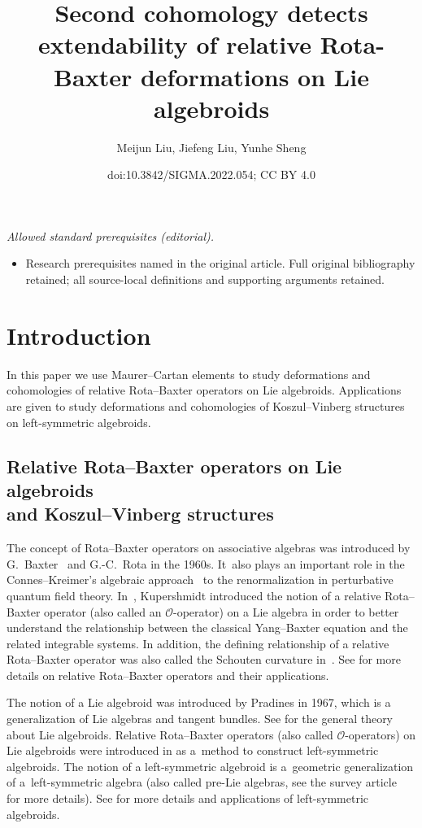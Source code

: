 \documentclass[10pt,a4paper]{amsart}
\title{Second cohomology detects extendability of relative Rota-Baxter deformations on Lie algebroids}
\author{Meijun Liu, Jiefeng Liu, Yunhe Sheng}
\date{doi:10.3842/SIGMA.2022.054; CC BY 4.0}
\numberwithin{equation}{section}
\newcommand{\huaO}{\mathcal{O}}
\begin{document}
\maketitle
\noindent\textit{Allowed standard prerequisites (editorial).}\begin{itemize}
\item Research prerequisites named in the original article. Full original bibliography retained; all source-local definitions and supporting arguments retained.
\end{itemize}\medskip
\section{Introduction}%

In this paper we use Maurer--Cartan elements to study deformations and cohomologies of relative Rota--Baxter operators on Lie algebroids. Applications are given to study deformations and cohomologies of Koszul--Vinberg structures on left-symmetric algebroids.

\subsection[Relative Rota--Baxter operators on Lie algebroids and Koszul--Vinberg structures]{Relative Rota--Baxter operators on Lie algebroids\\ and Koszul--Vinberg structures}

 The concept of Rota--Baxter operators on associative algebras was introduced by G.~Baxter~\cite{Ba} and G.-C.~Rota \cite{RotaI,RotaII} in the 1960s. It~also plays an important role in the Connes--Kreimer's algebraic approach~\cite{CK} to the renormalization in perturbative quantum field theory.
 In~\cite{Kuper1},
Kupershmidt introduced the notion of a relative Rota--Baxter operator (also called an $\huaO$-operator) on a Lie algebra in order to better understand the relationship between the classical Yang--Baxter equation and the related integrable systems. In addition, the defining relationship of a relative Rota--Baxter operator was also called the Schouten curvature in~\cite{Kos}. See \cite{Car,Fard,Gu0-1,Guo,Rota--Baxter_Lie_algebroid,PBG,Uchino2} for more details on relative Rota--Baxter operators and their applications.

 The notion of a Lie algebroid was introduced by Pradines in 1967, which
is a generalization of Lie algebras and tangent bundles.
See \cite{General-theory-of-Lie-groupoid-and-Lie-algebroid} for the general
theory about Lie algebroids. Relative Rota--Baxter operators (also called $\huaO$-operators) on Lie algebroids were introduced in \cite{LiuShengBaiChen} as a~method to construct left-symmetric algebroids. The notion of a left-symmetric algebroid is a~geometric generalization of a~left-symmetric algebra (also called pre-Lie algebras, see
the survey article~\cite{Pre-lie-algebra-in-geometry} for more details).
See \cite{BBo,LiuShengBaiChen,Boyom1,Boyom2} for more details and applications of left-symmetric algebroids.
\end{document}
